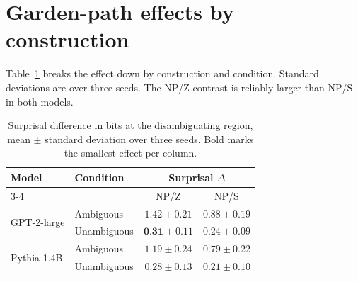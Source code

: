 \documentclass[11pt]{article}
\begin{document}
\section{Garden-path effects by construction}

Table~\ref{tab:npz} breaks the effect down by construction and condition.
Standard deviations are over three seeds. The NP/Z contrast is reliably larger
than NP/S in both models.

\begin{table}[t]
\centering
\begin{tabularx}{\textwidth}{llcc}
\toprule
\multirow{2}{*}{Model} & \multirow{2}{*}{Condition} & \multicolumn{2}{c}{Surprisal $\Delta$} \\
\cmidrule(lr){3-4}
 & & NP/Z & NP/S \\
\midrule
\multirow{2}{*}{GPT-2-large} & Ambiguous & $1.42 \pm 0.21$ & $0.88 \pm 0.19$ \\
 & Unambiguous & $\textbf{0.31} \pm 0.11$ & $0.24 \pm 0.09$ \\
\midrule
\multirow{2}{*}{Pythia-1.4B} & Ambiguous & $1.19 \pm 0.24$ & $0.79 \pm 0.22$ \\
 & Unambiguous & $0.28 \pm 0.13$ & $0.21 \pm 0.10$ \\
\bottomrule
\end{tabularx}
\caption{Surprisal difference in bits at the disambiguating region, mean $\pm$
standard deviation over three seeds. Bold marks the smallest effect per column.}
\label{tab:npz}
\end{table}
\end{document}
